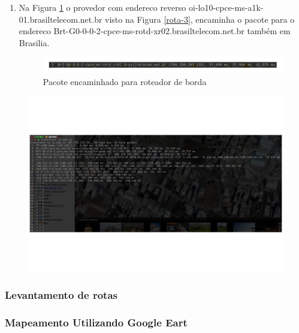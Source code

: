 \documentclass[
	article,			%
	11pt,				%
	oneside,			%
	a4paper,			%
	english,			%
	brazil,				%
	sumario=tradicional
	]{abntex2}
\begin{document}
\begin{enumerate}
 \item
 Na Figura \ref{rota-4} o provedor com endereco reverso oi-lo10-cpce-ms-a1k-01.brasiltelecom.net.br visto na Figura \ref{rota-3}, encaminha o pacote para o endereco Brt-G0-0-0-2-cpce-ms-rotd-xr02.brasiltelecom.net.br também em Brasilia. 
 \begin{figure}[!h]
 	\centering
 	\includegraphics[scale=0.6]{./rota-4.png}
 	\caption{Pacote encaminhado para roteador de borda}
 	\label{rota-4}
 \end{figure}
 	
 \end{enumerate}

	 
\begin{figure}[!h]
	\centering
	\includegraphics[scale=0.3]{./trauceroute-1.png}

	\label{Rotulo}
\end{figure}

\subsubsection{Levantamento de rotas}

\subsubsection{Mapeamento Utilizando Google Eart }
\end{document}
